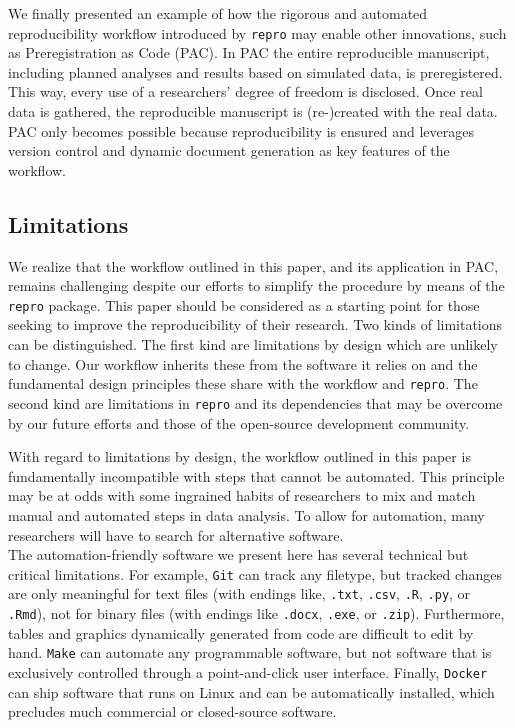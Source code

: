 \documentclass[psych,tutorial,submit,moreauthors,pdftex]{mdpi}
\begin{document}
We finally presented an example of how the rigorous and automated
reproducibility workflow introduced by \texttt{repro} may enable other
innovations, such as Preregistration as Code (PAC). In PAC the entire
reproducible manuscript, including planned analyses and results based on
simulated data, is preregistered. This way, every use of a researchers'
degree of freedom is disclosed. Once real data is gathered, the
reproducible manuscript is (re-)created with the real data. PAC only
becomes possible because reproducibility is ensured and leverages
version control and dynamic document generation as key features of the
workflow.

\hypertarget{limitations}{%
\subsection{Limitations}\label{limitations}}

We realize that the workflow outlined in this paper, and its application
in PAC, remains challenging despite our efforts to simplify the
procedure by means of the \texttt{repro} package. This paper should be
considered as a starting point for those seeking to improve the
reproducibility of their research. Two kinds of limitations can be
distinguished. The first kind are limitations by design which are
unlikely to change. Our workflow inherits these from the software it
relies on and the fundamental design principles these share with the
workflow and \texttt{repro}. The second kind are limitations in
\texttt{repro} and its dependencies that may be overcome by our future
efforts and those of the open-source development community.

With regard to limitations by design, the workflow outlined in this
paper is fundamentally incompatible with steps that cannot be automated.
This principle may be at odds with some ingrained habits of researchers
to mix and match manual and automated steps in data analysis. To allow
for automation, many researchers will have to search for alternative
software.\\
The automation-friendly software we present here has several technical
but critical limitations. For example, \texttt{Git} can track any
filetype, but tracked changes are only meaningful for text files (with
endings like, \texttt{.txt}, \texttt{.csv}, \texttt{.R}, \texttt{.py},
or \texttt{.Rmd}), not for binary files (with endings like
\texttt{.docx}, \texttt{.exe}, or \texttt{.zip}). Furthermore, tables
and graphics dynamically generated from code are difficult to edit by
hand. \texttt{Make} can automate any programmable software, but not
software that is exclusively controlled through a point-and-click user
interface. Finally, \texttt{Docker} can ship software that runs on Linux
and can be automatically installed, which precludes much commercial or
closed-source software.
\end{document}
